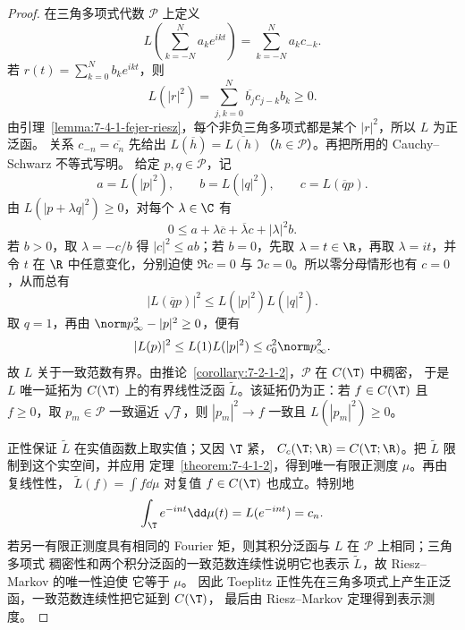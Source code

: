 \begin{proof}
在三角多项式代数 $\mathcal P$ 上定义
\[
 L\left(\sum_{k=-N}^Na_ke^{ikt}\right)=\sum_{k=-N}^Na_kc_{-k}.
\]
若 $r(t)=\sum_{k=0}^Nb_ke^{ikt}$，则
\[
 L(|r|^2)=\sum_{j,k=0}^N\overline{b_j}c_{j-k}b_k\ge0.
\]
由引理~\ref{lemma:7-4-1-fejer-riesz}，每个非负三角多项式都是某个 $|r|^2$，所以 $L$ 为正泛函。
关系 $c_{-n}=\overline{c_n}$ 先给出
$L(\overline h)=\overline{L(h)}$（$h\in\mathcal P$）。再把所用的 Cauchy--Schwarz 不等式写明。
给定 $p,q\in\mathcal P$，记
\[
 a=L(|p|^2),\qquad b=L(|q|^2),\qquad c=L(\overline q p).
\]
由 $L(|p+\lambda q|^2)\geq0$，对每个 $\lambda\in\C$ 有
\[
 0\leq a+\lambda\overline c+\overline\lambda c+|\lambda|^2b.
\]
若 $b>0$，取 $\lambda=-c/b$ 得 $|c|^2\leq ab$；若 $b=0$，先取
$\lambda=t\in\R$，再取 $\lambda=it$，并令 $t$ 在 $\R$ 中任意变化，分别迫使
$\Re c=0$ 与 $\Im c=0$。所以零分母情形也有 $c=0$，从而总有
\[
 |L(\overline q p)|^2\leq L(|p|^2)L(|q|^2).
\]
取 $q=1$，再由 $\norm p_\infty^2-|p|^2\ge0$，便有
\[
 |L(p)|^2\le L(1)L(|p|^2)
 \le c_0^2\norm p_\infty^2.
\]
故 $L$ 关于一致范数有界。由推论~\ref{corollary:7-2-1-2}，$\mathcal P$ 在 $C(\T)$ 中稠密，
于是 $L$ 唯一延拓为 $C(\T)$ 上的有界线性泛函 $\widetilde L$。该延拓仍为正：若
$f\in C(\T)$ 且 $f\ge0$，取 $p_m\in\mathcal P$ 一致逼近 $\sqrt f$，则
$|p_m|^2\to f$ 一致且 $L(|p_m|^2)\ge0$。

正性保证 $\widetilde L$ 在实值函数上取实值；又因 $\T$ 紧，
$C_c(\T;\R)=C(\T;\R)$。把 $\widetilde L$ 限制到这个实空间，并应用
定理~\ref{theorem:7-4-1-2}，得到唯一有限正测度 $\mu$。再由复线性性，
$\widetilde L(f)=\int f\dd\mu$ 对复值 $f\in C(\T)$ 也成立。特别地
\[
 \int_\T e^{-int}\dd\mu(t)=L(e^{-int})=c_n.
\]
若另一有限正测度具有相同的 Fourier 矩，则其积分泛函与 $L$ 在 $\mathcal P$ 上相同；三角多项式
稠密性和两个积分泛函的一致范数连续性说明它也表示 $\widetilde L$，故 Riesz--Markov 的唯一性迫使
它等于 $\mu$。
因此 Toeplitz 正性先在三角多项式上产生正泛函，一致范数连续性把它延到 $C(\T)$，
最后由 Riesz--Markov 定理得到表示测度。
\end{proof}

